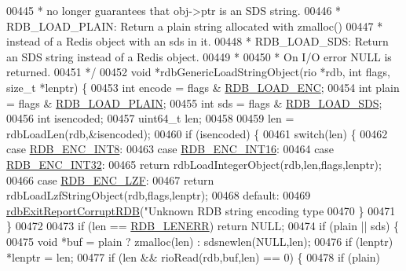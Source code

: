 \begin{DoxyCode}
{{{{{00445 \textcolor{comment}{ *               no longer guarantees that obj->ptr is an SDS string.}
00446 \textcolor{comment}{ * RDB\_LOAD\_PLAIN: Return a plain string allocated with zmalloc()}
00447 \textcolor{comment}{ *                 instead of a Redis object with an sds in it.}
00448 \textcolor{comment}{ * RDB\_LOAD\_SDS: Return an SDS string instead of a Redis object.}
00449 \textcolor{comment}{ *}
00450 \textcolor{comment}{ * On I/O error NULL is returned.}
00451 \textcolor{comment}{ */}
00452 \textcolor{keywordtype}{void} *rdbGenericLoadStringObject(rio *rdb, \textcolor{keywordtype}{int} flags, size\_t *lenptr) \{
00453     \textcolor{keywordtype}{int} encode = flags & \hyperlink{rdb_8h_aea74502dc3a9f291a2ac8f3bd7d6de24}{RDB\_LOAD\_ENC};
00454     \textcolor{keywordtype}{int} plain = flags & \hyperlink{rdb_8h_a5579c0ff24afa891ad41006def040a25}{RDB\_LOAD\_PLAIN};
00455     \textcolor{keywordtype}{int} sds = flags & \hyperlink{rdb_8h_ad15f5cc8e1a7789cc35b66f017e98a18}{RDB\_LOAD\_SDS};
00456     \textcolor{keywordtype}{int} isencoded;
00457     uint64\_t len;
00458 
00459     len = rdbLoadLen(rdb,&isencoded);
00460     \textcolor{keywordflow}{if} (isencoded) \{
00461         \textcolor{keywordflow}{switch}(len) \{
00462         \textcolor{keywordflow}{case} \hyperlink{rdb_8h_a56f2f16c5470043c643add1010823d23}{RDB\_ENC\_INT8}:
00463         \textcolor{keywordflow}{case} \hyperlink{rdb_8h_a79072da2d9fb562368f1798bdf8d7645}{RDB\_ENC\_INT16}:
00464         \textcolor{keywordflow}{case} \hyperlink{rdb_8h_ab74cba44dacad1f1f0d87dffba9efa98}{RDB\_ENC\_INT32}:
00465             \textcolor{keywordflow}{return} rdbLoadIntegerObject(rdb,len,flags,lenptr);
00466         \textcolor{keywordflow}{case} \hyperlink{rdb_8h_a9438d9c9147f6d8846e71c0722343a95}{RDB\_ENC\_LZF}:
00467             \textcolor{keywordflow}{return} rdbLoadLzfStringObject(rdb,flags,lenptr);
00468         \textcolor{keywordflow}{default}:
00469             \hyperlink{rdb_8c_afb34e310c0e5dfd9f8c2bebbec59c7f7}{rdbExitReportCorruptRDB}(\textcolor{stringliteral}{"Unknown RDB string encoding type %
00470         \}
00471     \}
00472 
00473     \textcolor{keywordflow}{if} (len == \hyperlink{rdb_8h_aa66b6ad7261656029e6a67cf78432b2d}{RDB\_LENERR}) \textcolor{keywordflow}{return} NULL;
00474     \textcolor{keywordflow}{if} (plain || sds) \{
00475         \textcolor{keywordtype}{void} *buf = plain ? zmalloc(len) : sdsnewlen(NULL,len);
00476         \textcolor{keywordflow}{if} (lenptr) *lenptr = len;
00477         \textcolor{keywordflow}{if} (len && rioRead(rdb,buf,len) == 0) \{
00478             \textcolor{keywordflow}{if} (plain)
}}}}}}
\end{DoxyCode}

